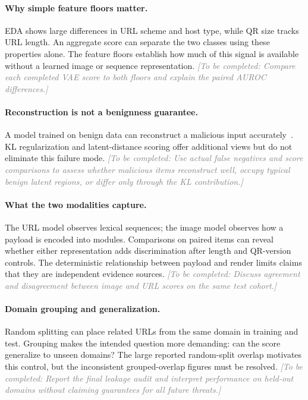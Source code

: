 \documentclass{article}
\newcommand{\pending}[1]{\textcolor{gray}{\textit{[To be completed: #1]}}}
\begin{document}
\paragraph{Why simple feature floors matter.}
EDA shows large differences in URL scheme and host type, while QR size tracks URL length.
An aggregate score can separate the two classes using these properties alone.
The feature floors establish how much of this signal is available without a learned image or sequence representation.
\pending{Compare each completed VAE score to both floors and explain the paired AUROC differences.}

\paragraph{Reconstruction is not a benignness guarantee.}
A model trained on benign data can reconstruct a malicious input accurately~\citep{bouman}.
KL regularization and latent-distance scoring offer additional views but do not eliminate this failure mode.
\pending{Use actual false negatives and score comparisons to assess whether malicious items reconstruct well, occupy typical benign latent regions, or differ only through the KL contribution.}

\paragraph{What the two modalities capture.}
The URL model observes lexical sequences; the image model observes how a payload is encoded into modules.
Comparisons on paired items can reveal whether either representation adds discrimination after length and QR-version controls.
The deterministic relationship between payload and render limits claims that they are independent evidence sources.
\pending{Discuss agreement and disagreement between image and URL scores on the same test cohort.}

\paragraph{Domain grouping and generalization.}
Random splitting can place related URLs from the same domain in training and test.
Grouping makes the intended question more demanding: can the score generalize to unseen domains?
The large reported random-split overlap motivates this control, but the inconsistent grouped-overlap figures must be resolved.
\pending{Report the final leakage audit and interpret performance on held-out domains without claiming guarantees for all future threats.}
\end{document}
